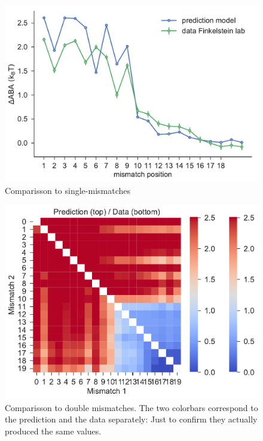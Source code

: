 \documentclass[a4paper,twoside]{revtex4-1}
\begin{document}
\begin{figure}[H]
\centering
\includegraphics[scale=0.5]{fig10_15_11_2018.pdf}
\caption{Comparisson to single-mismatches}
\end{figure}

\begin{figure}[H]
\centering
\includegraphics[scale=0.5]{fig11_15_11_2018.pdf}
\caption{Comparisson to double mismatches. The two colorbars correspond to the prediction and the data separately: Just to confirm they actually produced the same values.}
\end{figure}
\end{document}
